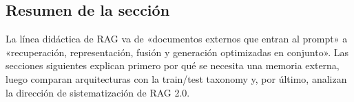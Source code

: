 \subsection{Resumen de la sección}

La línea didáctica de RAG va de «documentos externos que entran al prompt» a «recuperación, representación, fusión y generación optimizadas en conjunto». Las secciones siguientes explican primero por qué se necesita una memoria externa, luego comparan arquitecturas con la train/test taxonomy y, por último, analizan la dirección de sistematización de RAG 2.0.
